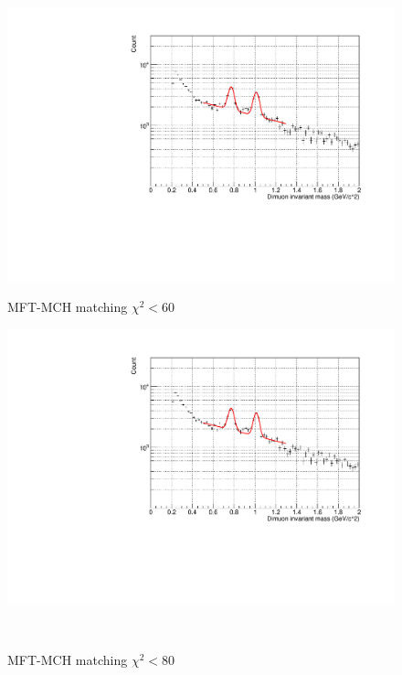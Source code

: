 \begin{figure}[H]
                \vspace{1em}
                \begin{minipage}{0.45\textwidth}
                    \centering
                    \includegraphics[width=\textwidth]{fig/3_4_4_Fit_chi2_60.pdf}
                    \caption*{MFT-MCH matching $\chi^2 < 60$}
                \end{minipage}
                \hfill
                \begin{minipage}{0.45\textwidth}
                    \centering
                    \includegraphics[width=\textwidth]{fig/3_4_4_Fit_chi2_80.pdf}
                    \caption*{MFT-MCH matching $\chi^2 < 80$} 
                \end{minipage}
                \\
                \vspace{1em}

\end{figure}
